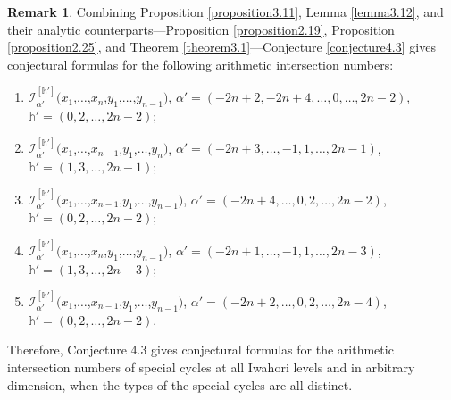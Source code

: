 \documentclass[11pt,oneside]{amsart}
\theoremstyle{plain}
\theoremstyle{definition}
\newtheorem{remark}[theorem]{Remark}
\theoremstyle{remark}
\newcommand{\CI}{{\mathcal I}}
\numberwithin{equation}{section}
\begin{document}
	\begin{remark}\label{remark4.5}
		Combining Proposition \ref{proposition3.11}, Lemma \ref{lemma3.12}, and their analytic counterparts---Proposition \ref{proposition2.19}, Proposition \ref{proposition2.25}, and Theorem \ref{theorem3.1}---Conjecture \ref{conjecture4.3} gives conjectural formulas for the following arithmetic intersection numbers:
		\begin{enumerate}
			\item $\CI_{\alpha'}^{[\mathds{h}']}(x_1$,$\dots$,$x_{n}$,$y_1$,$\dots$,$y_{n-1})$, $\alpha'=(-2n+2,-2n+4,\dots,0,\dots,2n-2)$, $\mathds{h}'=(0,2,\dots,2n-2)$;
			
			\item $\CI_{\alpha'}^{[\mathds{h}']}(x_1$,$\dots$,$x_{n-1}$,$y_1$,$\dots$,$y_{n})$, $\alpha'=(-2n+3,\dots,-1,1,\dots,2n-1)$, $\mathds{h}'=(1,3,\dots,2n-1)$;
			
			\item $\CI_{\alpha'}^{[\mathds{h}']}(x_1$,$\dots$,$x_{n-1}$,$y_1$,$\dots$,$y_{n-1})$, $\alpha'=(-2n+4,\dots,0,2,\dots,2n-2)$, $\mathds{h}'=(0,2,\dots,2n-2)$;
			
			\item $\CI_{\alpha'}^{[\mathds{h}']}(x_1$,$\dots$,$x_{n}$,$y_1$,$\dots$,$y_{n-1})$, $\alpha'=(-2n+1,\dots,-1,1,\dots,2n-3)$, $\mathds{h}'=(1,3,\dots,2n-3)$;
			
			\item $\CI_{\alpha'}^{[\mathds{h}']}(x_1$,$\dots$,$x_{n-1}$,$y_1$,$\dots$,$y_{n-1})$, $\alpha'=(-2n+2,\dots,0,2,\dots,2n-4)$, $\mathds{h}'=(0,2,\dots,2n-2)$.
		\end{enumerate}
		Therefore, Conjecture 4.3 gives conjectural formulas for the arithmetic intersection numbers of special cycles at all Iwahori levels and in arbitrary dimension, when the types of the special cycles are all distinct.
		
		
	\end{remark}
	
\end{document}
